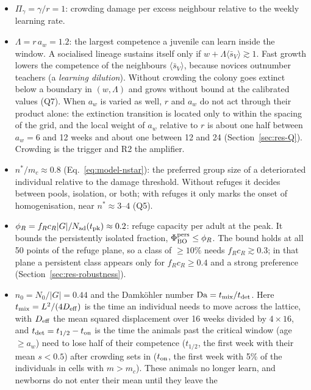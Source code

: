 \begin{itemize}
  \item $\Pi_\gamma=\gamma/r=1$: crowding damage per excess neighbour relative to the weekly learning rate.
  \item $\Lambda=r\,a_w=1.2$: the largest competence a juvenile can learn inside the window. A socialised
    lineage sustains itself only if $w+\Lambda\langle\bar s_V\rangle\gtrsim1$. Fast growth lowers the
    competence of the neighbours $\langle\bar s_V\rangle$, because novices outnumber teachers (a
    \emph{learning dilution}). Without crowding the colony goes extinct below a boundary in $(w,\Lambda)$ and grows
    without bound at the calibrated values (Q7). When $a_w$ is varied as well, $r$ and $a_w$ do not act through
    their product alone: the extinction transition is located only to within the spacing of the grid, and the local
    weight of $a_w$ relative to $r$ is about one half between $a_w=6$ and 12 weeks and about one between 12 and 24
    (Section~\ref{sec:res-Q}). Crowding is the trigger and R2 the amplifier.
  \item $n^*/m_c\approx0.8$ (Eq.~\eqref{eq:model-nstar}): the preferred group size of a deteriorated individual
    relative to the damage threshold. Without refuges it decides between pools, isolation, or both; with
    refuges it only marks the onset of homogenisation, near $n^*\approx3$--$4$ (Q5).
  \item $\phi_R=f_Rc_R|G|/N_{\rm ad}(t_{\rm pk})\approx0.2$: refuge capacity per adult at the peak. It bounds the
    persistently isolated fraction, $\Phi_{\rm BO}^{\rm pers}\le\phi_R$. The bound holds at all 50 points of the
    refuge plane, so a class of $\ge10\%$ needs $f_Rc_R\gtrsim0.3$; in that plane a persistent class appears only for
    $f_Rc_R\ge0.4$ and a strong preference (Section~\ref{sec:res-robustness}).
  \item $n_0=N_0/|G|=0.44$ and the Damk\"ohler number $\mathrm{Da}=t_{\rm mix}/t_{\rm det}$. Here
    $t_{\rm mix}=L^2/(4D_{\rm eff})$ is the time an individual needs to move across the lattice, with $D_{\rm eff}$ the
    mean squared displacement over 16 weeks divided by $4\times16$, and $t_{\rm det}=t_{1/2}-t_{\rm on}$ is the time
    the animals past the critical window (age $\ge a_w$) need to lose half of their competence ($t_{1/2}$, the first
    week with their mean $s<0.5$) after crowding sets in ($t_{\rm on}$, the first week with 5\% of the individuals in
    cells with $m>m_c$). These animals no longer learn, and newborns do not enter their mean until they leave the

\end{itemize}

